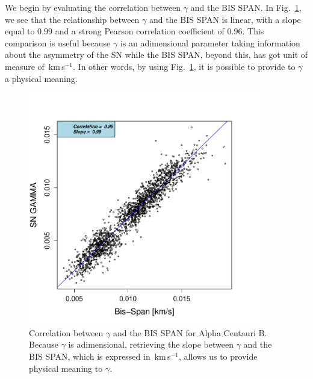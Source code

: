 \documentclass[11pt, oneside]{article}
\def\kms{\hbox{\,km\,s$^{-1}$}}       %
\begin{document}
We begin by evaluating the correlation between $\gamma$ and the BIS SPAN. In Fig.~\ref{fig:alphacent:corr.gamma}, we see that the relationship between $\gamma$ and the BIS SPAN is linear, with a slope equal to $0.99$ and a strong Pearson correlation coefficient of $0.96$. This comparison is useful because $\gamma$ is an adimensional parameter taking information about the asymmetry of the SN while the BIS SPAN, beyond this, has got unit of measure of \kms. In other words, by using Fig.~\ref{fig:alphacent:corr.gamma}, it is possible to provide to $\gamma$ a physical meaning.
%
\begin{figure}[htbp]
   \centering
\includegraphics[height = 4in]{HD12862_[2]gamma_vs_bisspan.pdf} 
   \caption{Correlation between $\gamma$ and the BIS SPAN for Alpha Centauri B. Because $\gamma$ is adimensional, retrieving the slope between $\gamma$ and the BIS SPAN, which is expressed in \kms, allows us to provide physical meaning to $\gamma$.}
   \label{fig:alphacent:corr.gamma}
\end{figure}
%
\end{document}
